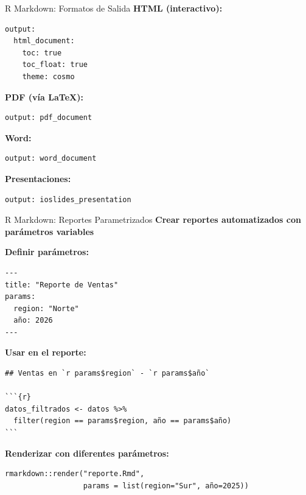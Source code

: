 \documentclass[aspectratio=169]{beamer}
\begin{document}
\begin{frame}[fragile]{R Markdown: Formatos de Salida}
\textbf{HTML (interactivo):}
\begin{verbatim}
output: 
  html_document:
    toc: true
    toc_float: true
    theme: cosmo
\end{verbatim}

\textbf{PDF (vía LaTeX):}
\begin{verbatim}
output: pdf_document
\end{verbatim}

\textbf{Word:}
\begin{verbatim}
output: word_document
\end{verbatim}

\textbf{Presentaciones:}
\begin{verbatim}
output: ioslides_presentation
\end{verbatim}
\end{frame}

\begin{frame}[fragile]{R Markdown: Reportes Parametrizados}
\textbf{Crear reportes automatizados con parámetros variables}

\vspace{0.2cm}

\textbf{Definir parámetros:}
\begin{verbatim}
---
title: "Reporte de Ventas"
params:
  region: "Norte"
  año: 2026
---
\end{verbatim}

\textbf{Usar en el reporte:}
\begin{verbatim}
## Ventas en `r params$region` - `r params$año`

```{r}
datos_filtrados <- datos %>%
  filter(region == params$region, año == params$año)
```
\end{verbatim}

\textbf{Renderizar con diferentes parámetros:}
\begin{verbatim}
rmarkdown::render("reporte.Rmd", 
                  params = list(region="Sur", año=2025))
\end{verbatim}
\end{frame}
\end{document}
